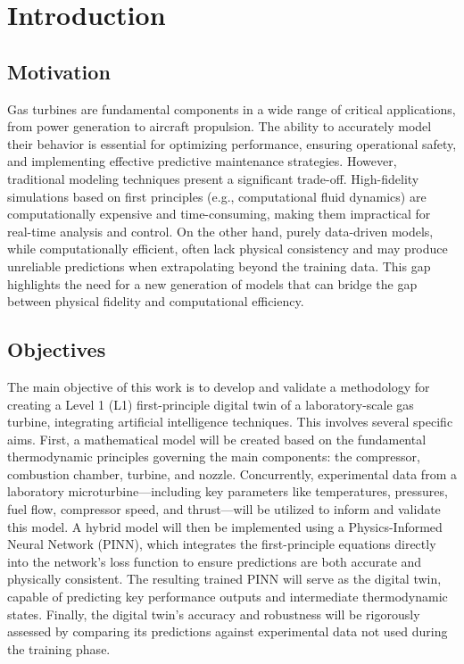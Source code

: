 \documentclass[
  12pt,
  oneside,
  a4paper,
  english,
  brazil]{abntex2}
\begin{document}
\newpage{}

\mainmatter

\chapter{\textbf{Introduction}}

\section{\texorpdfstring{\textbf{Motivation}}{}}\label{section}

Gas turbines are fundamental components in a wide range of critical
applications, from power generation to aircraft propulsion. The ability
to accurately model their behavior is essential for optimizing
performance, ensuring operational safety, and implementing effective
predictive maintenance strategies. However, traditional modeling
techniques present a significant trade-off. High-fidelity simulations
based on first principles (e.g., computational fluid dynamics) are
computationally expensive and time-consuming, making them impractical
for real-time analysis and control. On the other hand, purely
data-driven models, while computationally efficient, often lack physical
consistency and may produce unreliable predictions when extrapolating
beyond the training data. This gap highlights the need for a new
generation of models that can bridge the gap between physical fidelity
and computational efficiency.

\section{\texorpdfstring{\textbf{Objectives}}{}}\label{section-1}

The main objective of this work is to develop and validate a methodology
for creating a Level 1 (L1) first-principle digital twin of a
laboratory-scale gas turbine, integrating artificial intelligence
techniques. This involves several specific aims. First, a mathematical
model will be created based on the fundamental thermodynamic principles
governing the main components: the compressor, combustion chamber,
turbine, and nozzle. Concurrently, experimental data from a laboratory
microturbine---including key parameters like temperatures, pressures,
fuel flow, compressor speed, and thrust---will be utilized to inform and
validate this model. A hybrid model will then be implemented using a
Physics-Informed Neural Network (PINN), which integrates the
first-principle equations directly into the network's loss function to
ensure predictions are both accurate and physically consistent. The
resulting trained PINN will serve as the digital twin, capable of
predicting key performance outputs and intermediate thermodynamic
states. Finally, the digital twin's accuracy and robustness will be
rigorously assessed by comparing its predictions against experimental
data not used during the training phase.
\end{document}
